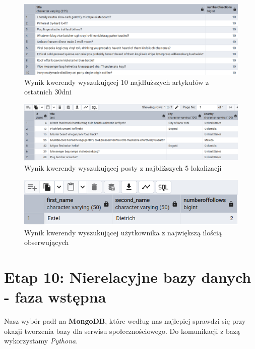 \documentclass{article}
\begin{document}
\begin{figure}[H]
    \centering
    \includegraphics[width=\textwidth]{images/top_10_longest_articles_from_last_30days.png}
    \caption{Wynik kwerendy wyszukującej 10 najdłuższych artykułów z ostatnich 30dni}
    \label{fig:sql9_1}
\end{figure}

\begin{figure}[H]
    \centering
    \includegraphics[width=\textwidth]{images/post_from_5_nearest_locations.png}
    \caption{Wynik kwerendy wyszukującej posty z najbliższych 5 lokalizacji}
    \label{fig:sql9_2}
\end{figure}

\begin{figure}[H]
    \centering
    \includegraphics[width=\textwidth]{images/user_with_most_follows.png}
    \caption{Wynik kwerendy wyszukującej użytkownika z największą ilością obserwujących}
    \label{fig:sql9_3}
\end{figure}

\section{Etap 10: Nierelacyjne bazy danych - faza wstępna}

Nasz wybór padł na \textbf{MongoDB}, które według nas najlepiej sprawdzi się przy okazji tworzenia bazy dla serwisu społecznościowego. Do komunikacji z bazą wykorzystamy \textit{Pythona}.
\end{document}
